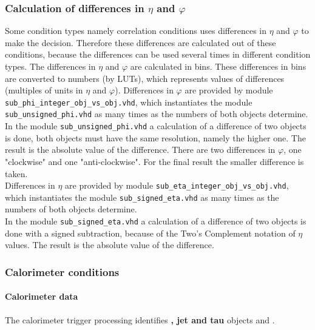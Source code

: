 \subsubsection{Calculation of differences in $\eta$ and $\varphi$}
\label{sec:gtl:calculation_differences}

Some condition types namely correlation conditions uses differences in $\eta$ and $\varphi$ to make the decision.
Therefore these differences are calculated out of these conditions, because the differences can be used several times in different condition types.
The differences in $\eta$ and $\varphi$ are calculated in bins. These differences in bins are converted to numbers (by LUTs),
which represents values of differences (multiples of units in $\eta$ and $\varphi$).
Differences in $\varphi$ are provided by module \texttt{sub\_phi\_integer\_obj\_vs\_obj.vhd}, which instantiates the module \texttt{sub\_unsigned\_phi.vhd} as many times as
the numbers of both objects determine.\\
In the module \texttt{sub\_unsigned\_phi.vhd} a calculation of a difference of two objects is done, both objects must have the same resolution, namely the higher one.
The result is the absolute value of the difference.
There are two differences in $\varphi$, one "clockwise" and one "anti-clockwise". For the final result the smaller difference is taken.\\
Differences in $\eta$ are provided by module \texttt{sub\_eta\_integer\_obj\_vs\_obj.vhd}, which instantiates the module \texttt{sub\_signed\_eta.vhd} as many times as
the numbers of both objects determine.\\
In the module \texttt{sub\_signed\_eta.vhd} a calculation of a difference of two objects is done with a signed subtraction, because of the Two's Complement notation of $\eta$ values.
The result is the absolute value of the difference. 

\subsubsection{Calorimeter conditions}
\label{sec:gtl:calorimeter_conditions}

\paragraph{Calorimeter data}
\label{sec:gtl:calorimeter_data}

The calorimeter trigger processing identifies \textbf{\egamma, jet and tau} objects and \textbf{\esums}.\\

